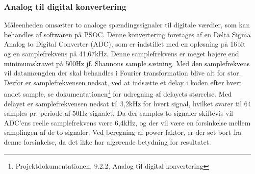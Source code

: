 
\subsubsection{Analog til digital konvertering}
Måleenheden omsætter to analoge spændingssignaler til digitale værdier, som kan behandles af softwaren på PSOC. Denne konvertering foretages af en Delta Sigma Analog to Digital Converter (ADC), som er indstillet med en opløsning på 16bit og en samplefrekvens på 41,67kHz. Denne samplefrekvens er meget højere end minimumskravet på 500Hz jf. Shannons sample sætning. Med den samplefrekvens vil datamængden der skal behandles i Fourier transformation blive alt for stor. Derfor er samplefrekvensen nedsat, ved at indsætte et delay i koden efter hvert andet sample, se dokumentationen\footnote{Projektdokumentationen, 9.2.2, Analog til digital konvertering} for udregning af delayets størrelse. Med delayet er samplefrekvensen nedsat til 3,2kHz for hvert signal, hvilket svarer til 64 samples pr. periode af 50Hz signalet. Da der samples to signaler skiftevis vil ADC'ens reelle samplefrekvens være 6,4kHz, og der vil være en forsinkelse mellem samplingen af de to signaler. Ved beregning af power faktor, er der set bort fra denne forsinkelse, da det ikke har afgørende betydning for resultatet.  
